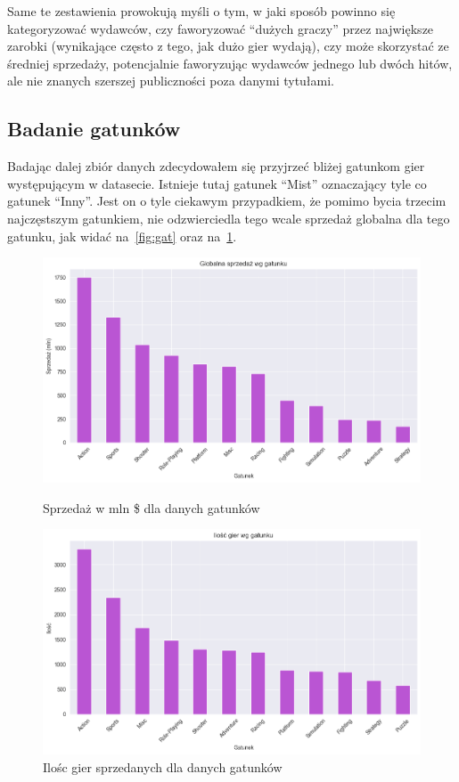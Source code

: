 \documentclass[11pt]{article}
\begin{document}
Same te zestawienia prowokują myśli o tym, w jaki sposób powinno się kategoryzować wydawców, czy faworyzować ``dużych graczy''
przez największe zarobki (wynikające często z tego, jak dużo gier wydają), czy może skorzystać ze średniej sprzedaży,
potencjalnie faworyzując wydawców jednego lub dwóch hitów, ale nie znanych szerszej publiczności poza danymi tytułami.

\subsection{Badanie gatunków}\label{subsec:badanie-gatunkow}
Badając dalej zbiór danych zdecydowałem się przyjrzeć bliżej gatunkom gier występującym w datasecie.
Istnieje tutaj gatunek ``Mist'' oznaczający tyle co gatunek ``Inny''.
Jest on o tyle ciekawym przypadkiem, że pomimo bycia trzecim najczęstszym gatunkiem, nie odzwierciedla tego wcale sprzedaż globalna dla tego gatunku, jak widać na~\ref{fig:gat} oraz na~\ref{fig:gat2}.

\begin{figure}[H]
    \centering
    \begin{minipage}[t]{0.48\linewidth}
        \centering
        \includegraphics[width=\linewidth]{figures/gatunek-sprzedaz}
        \caption{Sprzedaż w mln \$ dla danych gatunków}
        \label{fig:gat}
    \end{minipage}
    \hfill
    \begin{minipage}[t]{0.48\linewidth}
        \centering
        \includegraphics[width=\linewidth]{figures/gatunek-ilosc}
        \caption{Ilośc gier sprzedanych dla danych gatunków}
        \label{fig:gat2}
    \end{minipage}
\end{figure}
\end{document}
